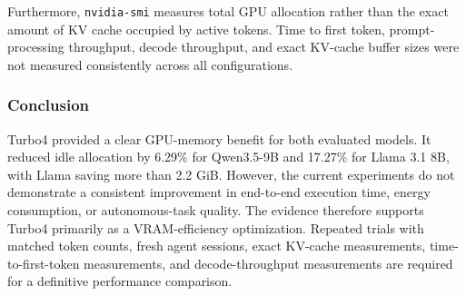Furthermore, \texttt{nvidia-smi} measures total GPU allocation rather than
the exact amount of KV cache occupied by active tokens. Time to first token,
prompt-processing throughput, decode throughput, and exact KV-cache buffer
sizes were not measured consistently across all configurations.

\subsubsection{Conclusion}

Turbo4 provided a clear GPU-memory benefit for both evaluated models. It
reduced idle allocation by 6.29\% for Qwen3.5-9B and 17.27\% for Llama 3.1
8B, with Llama saving more than 2.2 GiB. However, the current experiments do
not demonstrate a consistent improvement in end-to-end execution time,
energy consumption, or autonomous-task quality. The evidence therefore
supports Turbo4 primarily as a VRAM-efficiency optimization. Repeated trials
with matched token counts, fresh agent sessions, exact KV-cache measurements,
time-to-first-token measurements, and decode-throughput measurements are
required for a definitive performance comparison.
